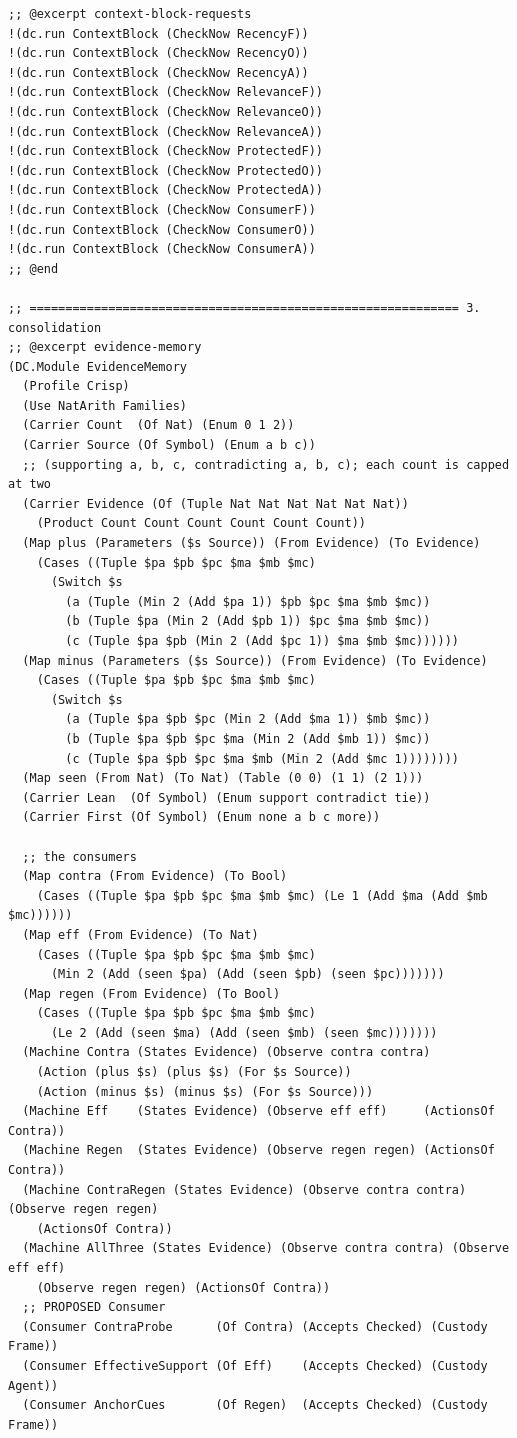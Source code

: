 \documentclass[11pt]{article}
\theoremstyle{definition}
\theoremstyle{plain}
\begin{document}
\begin{lstlisting}[style=mettafull]
;; @excerpt context-block-requests
!(dc.run ContextBlock (CheckNow RecencyF))
!(dc.run ContextBlock (CheckNow RecencyO))
!(dc.run ContextBlock (CheckNow RecencyA))
!(dc.run ContextBlock (CheckNow RelevanceF))
!(dc.run ContextBlock (CheckNow RelevanceO))
!(dc.run ContextBlock (CheckNow RelevanceA))
!(dc.run ContextBlock (CheckNow ProtectedF))
!(dc.run ContextBlock (CheckNow ProtectedO))
!(dc.run ContextBlock (CheckNow ProtectedA))
!(dc.run ContextBlock (CheckNow ConsumerF))
!(dc.run ContextBlock (CheckNow ConsumerO))
!(dc.run ContextBlock (CheckNow ConsumerA))
;; @end

;; ============================================================ 3. consolidation
;; @excerpt evidence-memory
(DC.Module EvidenceMemory
  (Profile Crisp)
  (Use NatArith Families)
  (Carrier Count  (Of Nat) (Enum 0 1 2))
  (Carrier Source (Of Symbol) (Enum a b c))
  ;; (supporting a, b, c, contradicting a, b, c); each count is capped at two
  (Carrier Evidence (Of (Tuple Nat Nat Nat Nat Nat Nat))
    (Product Count Count Count Count Count Count))
  (Map plus (Parameters ($s Source)) (From Evidence) (To Evidence)
    (Cases ((Tuple $pa $pb $pc $ma $mb $mc)
      (Switch $s
        (a (Tuple (Min 2 (Add $pa 1)) $pb $pc $ma $mb $mc))
        (b (Tuple $pa (Min 2 (Add $pb 1)) $pc $ma $mb $mc))
        (c (Tuple $pa $pb (Min 2 (Add $pc 1)) $ma $mb $mc))))))
  (Map minus (Parameters ($s Source)) (From Evidence) (To Evidence)
    (Cases ((Tuple $pa $pb $pc $ma $mb $mc)
      (Switch $s
        (a (Tuple $pa $pb $pc (Min 2 (Add $ma 1)) $mb $mc))
        (b (Tuple $pa $pb $pc $ma (Min 2 (Add $mb 1)) $mc))
        (c (Tuple $pa $pb $pc $ma $mb (Min 2 (Add $mc 1))))))))
  (Map seen (From Nat) (To Nat) (Table (0 0) (1 1) (2 1)))
  (Carrier Lean  (Of Symbol) (Enum support contradict tie))
  (Carrier First (Of Symbol) (Enum none a b c more))

  ;; the consumers
  (Map contra (From Evidence) (To Bool)
    (Cases ((Tuple $pa $pb $pc $ma $mb $mc) (Le 1 (Add $ma (Add $mb $mc))))))
  (Map eff (From Evidence) (To Nat)
    (Cases ((Tuple $pa $pb $pc $ma $mb $mc)
      (Min 2 (Add (seen $pa) (Add (seen $pb) (seen $pc)))))))
  (Map regen (From Evidence) (To Bool)
    (Cases ((Tuple $pa $pb $pc $ma $mb $mc)
      (Le 2 (Add (seen $ma) (Add (seen $mb) (seen $mc)))))))
  (Machine Contra (States Evidence) (Observe contra contra)
    (Action (plus $s) (plus $s) (For $s Source))
    (Action (minus $s) (minus $s) (For $s Source)))
  (Machine Eff    (States Evidence) (Observe eff eff)     (ActionsOf Contra))
  (Machine Regen  (States Evidence) (Observe regen regen) (ActionsOf Contra))
  (Machine ContraRegen (States Evidence) (Observe contra contra) (Observe regen regen)
    (ActionsOf Contra))
  (Machine AllThree (States Evidence) (Observe contra contra) (Observe eff eff)
    (Observe regen regen) (ActionsOf Contra))
  ;; PROPOSED Consumer
  (Consumer ContraProbe      (Of Contra) (Accepts Checked) (Custody Frame))
  (Consumer EffectiveSupport (Of Eff)    (Accepts Checked) (Custody Agent))
  (Consumer AnchorCues       (Of Regen)  (Accepts Checked) (Custody Frame))


\end{lstlisting}
\end{document}
